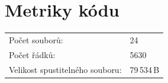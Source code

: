 \documentclass[12pt,a4paper,titlepage,final]{article}
\begin{document}
\section{Metriky kódu} \label{metriky}
\begin{tabular}{ll}
  Počet souborů: & 24 \\
  Počet řádků: & 5630 \\
  Velikost spustitelného souboru: & 79\,534\,B \\
\end{tabular}

%
%
%
\appendix

\end{document}

